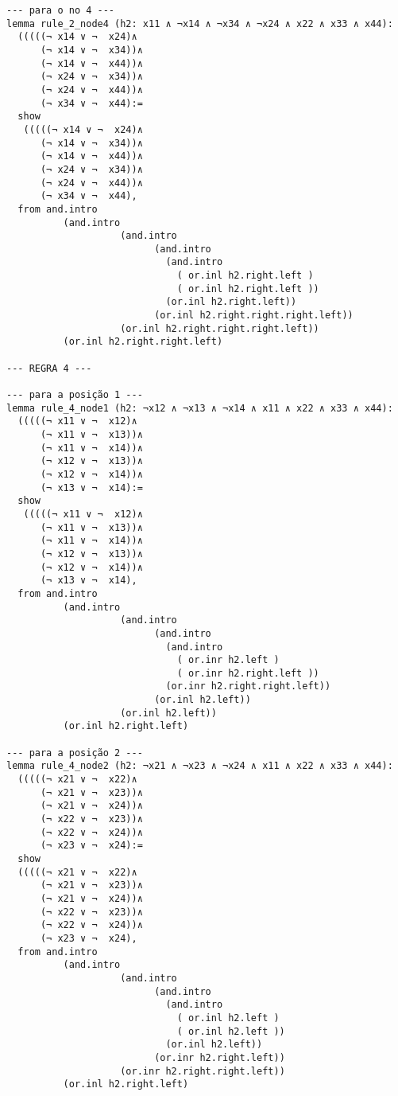 \begin{enumerate}
\begin{lstlisting}
--- para o no 4 ---
lemma rule_2_node4 (h2: x11 ∧ ¬x14 ∧ ¬x34 ∧ ¬x24 ∧ x22 ∧ x33 ∧ x44):
  (((((¬ x14 ∨ ¬  x24)∧
      (¬ x14 ∨ ¬  x34))∧ 
      (¬ x14 ∨ ¬  x44))∧ 
      (¬ x24 ∨ ¬  x34))∧ 
      (¬ x24 ∨ ¬  x44))∧ 
      (¬ x34 ∨ ¬  x44):=
  show
   (((((¬ x14 ∨ ¬  x24)∧
      (¬ x14 ∨ ¬  x34))∧ 
      (¬ x14 ∨ ¬  x44))∧ 
      (¬ x24 ∨ ¬  x34))∧ 
      (¬ x24 ∨ ¬  x44))∧ 
      (¬ x34 ∨ ¬  x44),
  from and.intro
          (and.intro
                    (and.intro
                          (and.intro
                            (and.intro
                              ( or.inl h2.right.left ) 
                              ( or.inl h2.right.left ))
                            (or.inl h2.right.left))
                          (or.inl h2.right.right.right.left))
                    (or.inl h2.right.right.right.left))
          (or.inl h2.right.right.left)

--- REGRA 4 ---

--- para a posição 1 ---
lemma rule_4_node1 (h2: ¬x12 ∧ ¬x13 ∧ ¬x14 ∧ x11 ∧ x22 ∧ x33 ∧ x44):
  (((((¬ x11 ∨ ¬  x12)∧
      (¬ x11 ∨ ¬  x13))∧ 
      (¬ x11 ∨ ¬  x14))∧ 
      (¬ x12 ∨ ¬  x13))∧ 
      (¬ x12 ∨ ¬  x14))∧ 
      (¬ x13 ∨ ¬  x14):=
  show
   (((((¬ x11 ∨ ¬  x12)∧
      (¬ x11 ∨ ¬  x13))∧ 
      (¬ x11 ∨ ¬  x14))∧ 
      (¬ x12 ∨ ¬  x13))∧ 
      (¬ x12 ∨ ¬  x14))∧ 
      (¬ x13 ∨ ¬  x14),
  from and.intro
          (and.intro
                    (and.intro
                          (and.intro
                            (and.intro
                              ( or.inr h2.left ) 
                              ( or.inr h2.right.left ))
                            (or.inr h2.right.right.left))
                          (or.inl h2.left))
                    (or.inl h2.left))
          (or.inl h2.right.left)

--- para a posição 2 ---
lemma rule_4_node2 (h2: ¬x21 ∧ ¬x23 ∧ ¬x24 ∧ x11 ∧ x22 ∧ x33 ∧ x44):
  (((((¬ x21 ∨ ¬  x22)∧
      (¬ x21 ∨ ¬  x23))∧ 
      (¬ x21 ∨ ¬  x24))∧ 
      (¬ x22 ∨ ¬  x23))∧ 
      (¬ x22 ∨ ¬  x24))∧ 
      (¬ x23 ∨ ¬  x24):=
  show
  (((((¬ x21 ∨ ¬  x22)∧
      (¬ x21 ∨ ¬  x23))∧ 
      (¬ x21 ∨ ¬  x24))∧ 
      (¬ x22 ∨ ¬  x23))∧ 
      (¬ x22 ∨ ¬  x24))∧ 
      (¬ x23 ∨ ¬  x24),
  from and.intro
          (and.intro
                    (and.intro
                          (and.intro
                            (and.intro
                              ( or.inl h2.left ) 
                              ( or.inl h2.left ))
                            (or.inl h2.left))
                          (or.inr h2.right.left))
                    (or.inr h2.right.right.left))
          (or.inl h2.right.left)


\end{lstlisting}
\end{enumerate}
